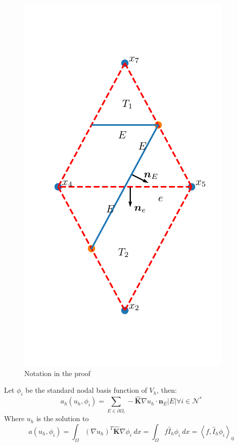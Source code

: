 \documentclass[../Main/main.tex]{subfiles}
\begin{document}
	\begin{figure}[H]\label{fig:two triangles}
		\centering
		\includegraphics{two triangles.pdf}
		\caption{Notation in the proof}
	\end{figure}
	\begin{lemma}\label{lemma:caowolmuth}
	Let $\phi_i$ be the standard nodal basis function of $V_h$, then:
		\begin{equation}
			a_h(u_h,\phi_i) = \sum_{E \in \partial \Omega_i} -\pmb{\hat{K}}\nabla u_h \cdot \pmb{n}_E |E| \forall i \in \mathcal{N}^*
		\end{equation}
		Where $u_h$ is the solution to 
		\begin{equation}\label{eq:assumption}
		a(u_h,\phi_i) = \int_{\Omega}(\nabla u_h)^T \pmb{\hat{K}}\nabla \phi_i \ dx = \int_{\Omega} f \hat{I}_h \phi_i \ dx = \left\langle f,\hat{I}_h \phi_i \right \rangle_0
		\end{equation}
	\end{lemma}
\end{document}
